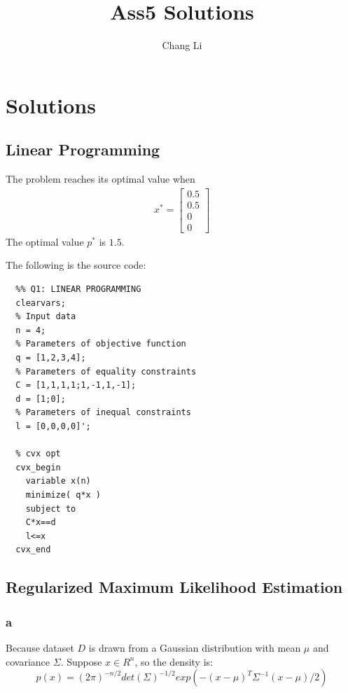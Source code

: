 \documentclass[10pt,a4paper]{article}
\begin{document}
\title{Ass5 Solutions}
\author{Chang Li}
\maketitle

\section{Solutions}

\subsection{Linear Programming}
The problem reaches its optimal value when
\begin{align*}
  x^*=\begin{bmatrix}
    0.5\\
    0.5\\
    0\\
    0
  \end{bmatrix}
\end{align*}
The optimal value $p^*$ is $1.5$.

The following is the source code:
\begin{lstlisting}
  %% Q1: LINEAR PROGRAMMING
  clearvars;
  % Input data
  n = 4;
  % Parameters of objective function
  q = [1,2,3,4];
  % Parameters of equality constraints
  C = [1,1,1,1;1,-1,1,-1];
  d = [1;0];
  % Parameters of inequal constraints
  l = [0,0,0,0]';

  % cvx opt
  cvx_begin
    variable x(n)
    minimize( q*x )
    subject to
    C*x==d
    l<=x
  cvx_end
\end{lstlisting}

\subsection{Regularized Maximum Likelihood Estimation}

\subsubsection{a}
Because dataset $D$ is drawn from a Gaussian distribution
with mean $\mu$ and covariance $\Sigma$. Suppose $x\in R^n$,
so the density is:
$$p(x) = (2\pi)^{-n/2}det(\Sigma)^{-1/2}exp(-(x-\mu)^T\Sigma^{-1}(x-\mu)/2)$$
\end{document}
